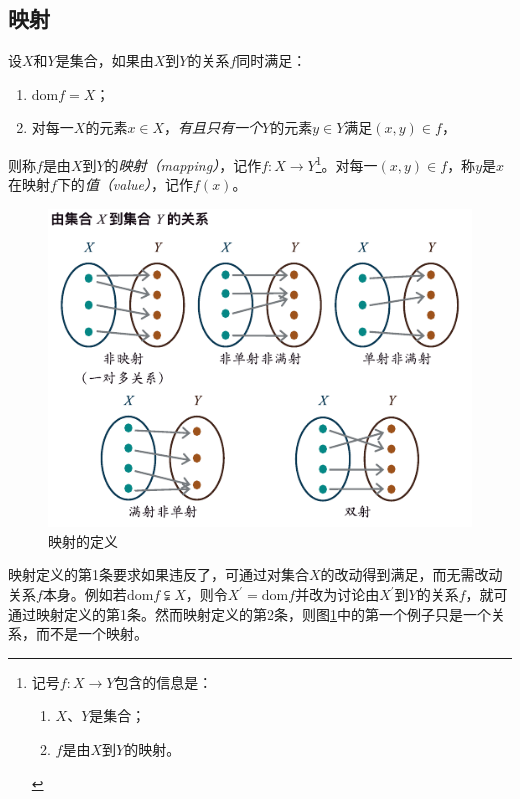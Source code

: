 \documentclass[../main.tex]{subfiles}
\begin{document}
\subsection{映射}
\begin{definition}
    设$X$和$Y$是集合，如果由$X$到$Y$的关系$f$同时满足：
    \begin{enumerate}
        \item $\mathrm{dom}f=X$；
        \item 对每一$X$的元素$x\in X$，\emph{有且只有一个}$Y$的元素$y\in Y$满足$\left(x,y\right)\in f$，
    \end{enumerate}
    则称$f$是由$X$到$Y$的\emph{映射（mapping）}，记作$f:X\rightarrow Y$\footnote{记号$f:X\rightarrow Y$包含的信息是：
        \begin{enumerate}
            \item $X$、$Y$是集合；
            \item $f$是由$X$到$Y$的映射。
        \end{enumerate}
    }。对每一$\left(x,y\right)\in f$，称$y$是$x$在映射$f$下的\emph{值（value）}，记作$f\left(x\right)$。
\end{definition}

\begin{figure}[htbp]
    \centering
    \includegraphics{../images/mapping.pdf}
    \caption{映射的定义}
    \label{fig:II.1.3}
\end{figure}

映射定义的第1条要求如果违反了，可通过对集合$X$的改动得到满足，而无需改动关系$f$本身。例如若$\mathrm{dom}f\subsetneqq X$，则令$X^\prime=\mathrm{dom}f$并改为讨论由$X^\prime$到$Y$的关系$f$，就可通过映射定义的第1条。然而映射定义的第2条，则图\ref{fig:II.1.3}中的第一个例子只是一个关系，而不是一个映射。
\end{document}
